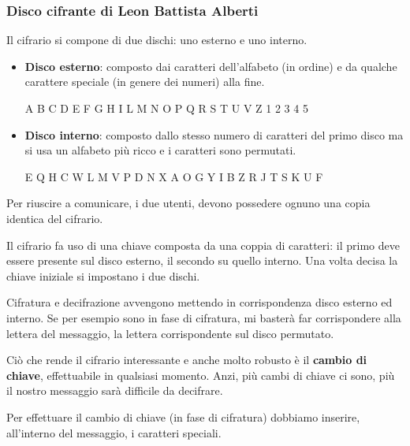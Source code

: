 \subsubsection{Disco cifrante di Leon Battista Alberti}
Il cifrario si compone di due dischi: uno esterno e uno interno.
\begin{itemize}
	\item \textbf{Disco esterno}: composto dai caratteri dell'alfabeto (in ordine) e da qualche carattere speciale (in
	      genere dei numeri) alla fine.
	      \begin{center}
		      A B C D E F G H I L M N O P Q R S T U V Z 1 2 3 4 5
	      \end{center}
	\item \textbf{Disco interno}: composto dallo stesso numero di caratteri del primo disco ma si usa un alfabeto
	      pi\`u ricco e i caratteri sono permutati.
	      \begin{center}
		      E Q H C W L M V P D N X A O G Y I B Z R J T S K U F
	      \end{center}
\end{itemize}
Per riuscire a comunicare, i due utenti, devono possedere ognuno una copia identica del cifrario.

Il cifrario fa uso di una chiave composta da una coppia di caratteri: il primo deve essere presente sul disco esterno,
il secondo su quello interno. Una volta decisa la chiave iniziale si impostano i due dischi.

Cifratura e decifrazione avvengono mettendo in corrispondenza disco esterno ed interno. Se per esempio sono in fase di
cifratura, mi baster\`a far corrispondere alla lettera del messaggio, la lettera corrispondente sul disco permutato.

Ci\`o che rende il cifrario interessante e anche molto robusto \`e il \textbf{cambio di chiave}, effettuabile in
qualsiasi momento. Anzi, pi\`u cambi di chiave ci sono, pi\`u il nostro messaggio sar\`a difficile da decifrare.

Per effettuare il cambio di chiave (in fase di cifratura) dobbiamo inserire, all'interno del messaggio, i caratteri
speciali.

